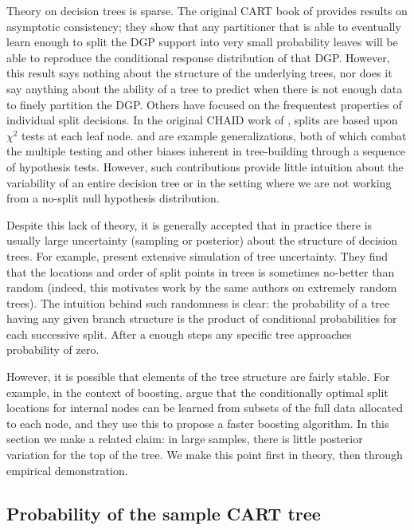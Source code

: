 \documentclass{article}
\begin{document}
Theory on decision trees is sparse. The original CART book of
\cite{breiman_classification_1984} provides results on asymptotic consistency;
they show that any partitioner that is able to eventually learn enough to
split the DGP support into very small probability leaves will be able to
reproduce the conditional response distribution of that DGP. However, this
result says nothing about the structure of the underlying trees, nor does it
say anything about the ability of a tree to predict when there is not enough
data to finely partition the DGP.  Others have focused on the frequentest
properties of individual split decisions. In the original CHAID work of
\cite{kass_exploratory_1980}, splits are based upon $\chi^2$ tests at each
leaf node. \cite{loh_regression_2002} and
\cite{hothorn_unbiased_2006} are example generalizations, both of which
combat the multiple testing and other biases inherent in
tree-building through a sequence of hypothesis tests. However, such
contributions provide little intuition about the variability of an
entire decision tree or in the setting where we are not working from a
no-split null hypothesis distribution.

Despite this lack of theory, it is generally accepted that in practice there is
usually  large  uncertainty (sampling or posterior) about the
structure of decision trees. For example, \cite{geurts_investigation_2000}
present extensive simulation of tree
uncertainty. They find that the locations and order of split points in
trees is sometimes no-better than random (indeed, this motivates work by the
same authors on extremely random trees). The intuition behind such randomness
is clear: the probability of a tree having any given branch structure is the
product of conditional probabilities for each successive split. After a enough
steps any specific tree approaches probability of zero. 

However, it is possible that elements of the tree structure are
fairly stable. For example, in the context of boosting,
\cite{appel_quickly_2013} argue that the conditionally optimal
split locations for internal nodes can be learned from
subsets of the full data allocated to each node, and they use this to propose
a faster boosting algorithm. In this section we make a related claim: 
in large samples, there is little posterior variation for the top of the tree. 
We make this point first in theory, then through empirical demonstration.

\subsection{Probability of the sample CART
tree}\label{probability-of-the-sample-cart-tree}
\end{document}
